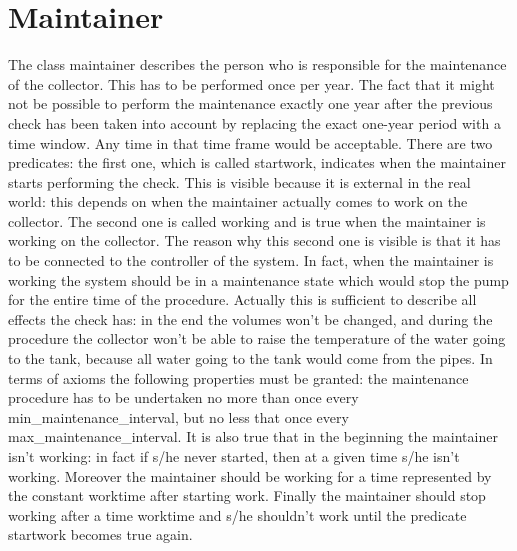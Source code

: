 \documentclass[a4paper,12pt]{article}
\begin{document}
\pagebreak
\begin{adjustwidth}{-4em}{-4em}
\end{adjustwidth}
\pagebreak

\section{Maintainer}

The class maintainer describes the person who is responsible for the maintenance of the collector. This has to be performed once per year. The fact that it might not be possible to perform the maintenance exactly one year after the previous check has been taken into account by replacing the exact one-year period with a time window. Any time in that time frame would be acceptable. There are two predicates: the first one, which is called startwork, indicates when the maintainer starts performing the check. This is visible because it is external in the real world: this depends on when the maintainer actually comes to work on the collector. The second one is called working and is true when the maintainer is working on the collector. The reason why this second one is visible is that it has to be connected to the controller of the system. In fact, when the maintainer is working the system should be in a maintenance state which would stop the pump for the entire time of the procedure. Actually this is sufficient to describe all effects the check has: in the end the volumes won't be changed, and during the procedure the collector won't be able to raise the temperature of the water going to the tank, because all water going to the tank would come from the pipes. In terms of axioms the following properties must be granted: the maintenance procedure has to be undertaken no more than once every min\_maintenance\_interval, but no less that once every max\_maintenance\_interval. It is also true that in the beginning the maintainer isn't working: in fact if s/he never started, then at a given time s/he isn't working. Moreover the maintainer should be working for a time represented by the constant worktime after starting work. Finally the maintainer should stop working after a time worktime and s/he shouldn't work until the predicate startwork becomes true again.

\pagebreak
\begin{adjustwidth}{-4em}{-4em}
\end{adjustwidth}
\pagebreak
\end{document}
